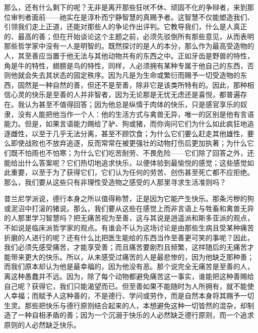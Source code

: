 那么，还有什么剩下的呢？无非是离开那些狂吠不休、顽固不化的争辩者，来到那位审判者面前——祂实在是淳朴而宁静智慧的真赐予者。这智慧不仅能塑造我们、引领我们走上正道，还能对那些人的争论作出评判。它教导我们，什么是人真正的、最高的善；但在开始谈论这个主题之前，必须先驳倒所有那些意见，从而表明那些哲学家中没有一人是明智的。既然探讨的是人的本分，那么作为最高受造物的人，其至善应当置于他无法与其他动物共有的东西之中。正如牙齿是野兽的特性，角是牛的特性，翅膀是鸟的特性，同样，人必须拥有某种专属于他自己的东西，否则他就会失去其状态的固定秩序。因为凡是为生命或繁衍而赐予一切受造物的东西，固然是一种自然的善，但还不是至善，除非它是该类所特有的。因此，那种相信心灵的快乐是至善的人并非智者，因为无论那是无忧无虑还是喜悦，都普遍存在。我认为甚至不值得回答；因为他总是纵情于肉体的快乐，只是感官享乐的奴隶，没有人能把他当作一个人：他的生活方式与禽兽无异，唯一的区别是他有言语能力。但是，如果言语能力赐给了驴、狗或猪，而你询问它们为什么如此疯狂地追逐雌性，以至于几乎无法分离，甚至不顾饮食；为什么它们要么赶走其他雄性，要么即使战败也不放弃追逐，反而常常在被更强壮的动物打伤后更加执著；为什么它们既不怕雨也不怕寒；为什么它们吃苦耐劳、不畏危险——它们除了回答之外，还能给出什么答案呢？它们热切地追求快乐，以便体验到最愉悦的感觉；这些感觉如此重要，以至于为了获得它们，它们认为任何的劳苦、创伤甚至死亡都不应拒绝。那么，我们要从这些只有非理性受造物之感受的人那里寻求生活准则吗？\par

昔兰尼学派说，德行本身之所以值得称赞，正是因为它能产生快乐。那条污秽的狗或泥沼中打滚的猪说。那么，我们要从这些在感觉上而非言语上与牲畜和禽兽无异的人那里学习智慧吗？把无痛苦视为至善，这与其说是逍遥派和斯多亚派的观点，不如说是临床派哲学家的观点。有谁会不认为这场讨论是由那些生病且受某种痛苦折磨的人进行的呢？还有什么比把医生能给的东西当作至善更可笑的事呢？因此，我们必须先感受痛苦，才能享受善；而且痛苦要剧烈且频繁，这样随后的无痛苦才能带来更大的快乐。所以，从未感受过痛苦的人是最悲惨的，因为他缺乏那种善；而我们原本却认为他是最幸福的，因为他没有恶。那个说完全无痛苦是至善的人，离这种愚蠢并不远。因为，除了每个动物都避免痛苦这一事实，谁能把这种善赐给自己呢？获得它，我们只能渴望而已。但至善如果不能随时为人所拥有，就不能使人幸福；而赋予人这种善的，不是德行、学问或劳作，而是自然本身将其赐予一切生灵。那些把快乐与德行原则结合起来的人，本想避免这种一切皆然的混杂，却制造了一种自相矛盾的善；因为一个沉溺于快乐的人必然缺乏德行原则，而一个追求原则的人必然缺乏快乐。\par

